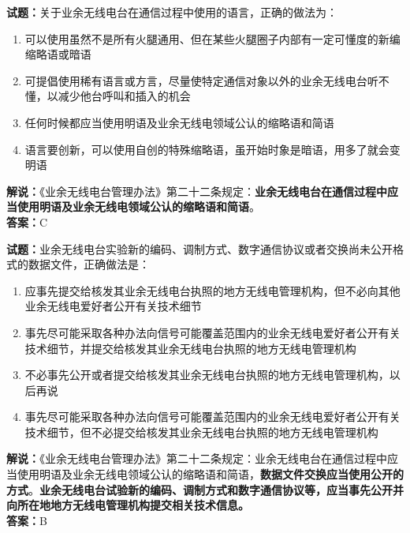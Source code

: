 \documentclass{ctexbook}
\begin{document}
\bigskip

\noindent\textbf{试题：}关于业余无线电台在通信过程中使用的语言，正确的做法为：
\begin{enumerate}[leftmargin=3em]
  \item 可以使用虽然不是所有火腿通用、但在某些火腿圈子内部有一定可懂度的新编缩略语或暗语
  \item 可提倡使用稀有语言或方言，尽量使特定通信对象以外的业余无线电台听不懂，以减少他台呼叫和插入的机会
  \item 任何时候都应当使用明语及业余无线电领域公认的缩略语和简语
  \item 语言要创新，可以使用自创的特殊缩略语，虽开始时象是暗语，用多了就会变明语
\end{enumerate}
\noindent\textbf{解说：}《业余无线电台管理办法》第二十二条规定：\textbf{业余无线电台在通信过程中应当使用明语及业余无线电领域公认的缩略语和简语}。\\\noindent\textbf{答案：}C

\bigskip

\noindent\textbf{试题：}业余无线电台实验新的编码、调制方式、数字通信协议或者交换尚未公开格式的数据文件，正确做法是：
\begin{enumerate}[leftmargin=3em]
  \item 应事先提交给核发其业余无线电台执照的地方无线电管理机构，但不必向其他业余无线电爱好者公开有关技术细节
  \item 事先尽可能采取各种办法向信号可能覆盖范围内的业余无线电爱好者公开有关技术细节，并提交给核发其业余无线电台执照的地方无线电管理机构
  \item 不必事先公开或者提交给核发其业余无线电台执照的地方无线电管理机构，以后再说
  \item 事先尽可能采取各种办法向信号可能覆盖范围内的业余无线电爱好者公开有关技术细节，但不必提交给核发其业余无线电台执照的地方无线电管理机构
\end{enumerate}
\noindent\textbf{解说：}《业余无线电台管理办法》第二十二条规定：业余无线电台在通信过程中应当使用明语及业余无线电领域公认的缩略语和简语，\textbf{数据文件交换应当使用公开的方式}。\textbf{业余无线电台试验新的编码、调制方式和数字通信协议等，应当事先公开并向所在地地方无线电管理机构提交相关技术信息。}\\\noindent\textbf{答案：}B

\bigskip
\end{document}
